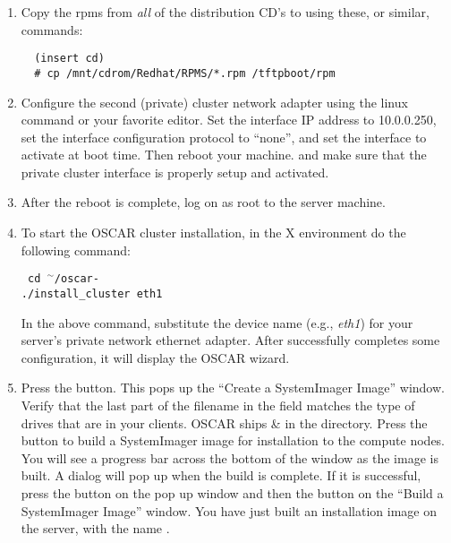 \begin {enumerate}

\item Copy the rpms from \emph{all} of the distribution CD's to
   using these, or similar, commands:

\begin{verbatim}
  (insert cd)
  # cp /mnt/cdrom/Redhat/RPMS/*.rpm /tftpboot/rpm
\end{verbatim}

\item Configure the second (private) cluster network adapter using the
  linux  command or your favorite editor. Set
  the interface IP address to 10.0.0.250, set the interface
  configuration protocol to ``none'', and set the interface to
  activate at boot time.  Then reboot your machine. and make sure that
  the private cluster interface is properly setup and activated.


\item After the reboot is complete, log on as root to the server
  machine.
  
\item To start the OSCAR cluster installation, in the X environment do
  the following command:

\vspace{11pt}
{\tt
  cd $^\sim$/oscar-\oscarversion \\
  ./install\_cluster eth1
}
\vspace{11pt}
  
In the above command, substitute the device name (e.g., \emph{eth1})
for your server's private network ethernet adapter. After
 successfully completes some configuration, it
will display the OSCAR wizard.  


\item Press the  button.  This pops
  up the ``Create a SystemImager Image'' window. Verify that the last
  part of the filename in the  field
  matches the type of drives that are in your clients. OSCAR ships
   \&  in the
   directory.  Press the  button
  to build a SystemImager image for installation to the compute nodes.
  You will see a progress bar across the bottom of the window as the
  image is built.  A dialog will pop up when the build is complete.
  If it is successful, press the  button on the pop up
  window and then the  button on the ``Build a
  SystemImager Image'' window. You have just built an installation
  image on the server, with the name .


\end{enumerate}
